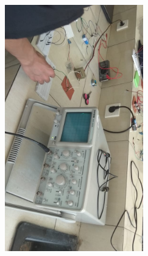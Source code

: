\documentclass[12pt,a4paper]{article}
\begin{document}
\begin{figure}
\begin{center}
\includegraphics[width=6cm, height=12cm]{g6.png}
\end{center}
\end{figure}
\vspace{2cm}
\end{document}
